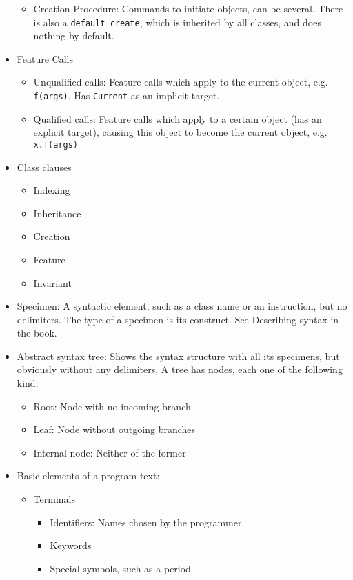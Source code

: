 \documentclass[a4paper]{article}
\newcommand{\inline}[1]{\lstinline!#1!}%
\begin{document}
\begin{itemize}
\begin{itemize}
\item Creation Procedure: Commands to initiate objects, can be several. There is also a \inline{default_create}, which is inherited by all classes, and does nothing by default. 
\end{itemize}
\item Feature Calls
\begin{itemize}
\item Unqualified calls: Feature calls which apply to the current object, e.g. \inline{f(args)}. Has \inline{Current} as an implicit target.
\item Qualified calls: Feature calls which apply to a certain object (has an explicit target), causing this object to become the current object, e.g. \inline{x.f(args)}
\end{itemize}
\item Class clauses
\begin{itemize}
\item Indexing
\item Inheritance
\item Creation
\item Feature
\item Invariant
\end{itemize}
\item Specimen: A syntactic element, such as a class name or an instruction, but no delimiters. The type of a specimen is its construct. See Describing syntax in the book.
\item Abstract syntax tree: Shows the syntax structure with all its specimens, but obviously without any delimiters, A tree has nodes, each one of the following kind:
\begin{itemize}
\item Root: Node with no incoming branch.
\item Leaf: Node without outgoing branches
\item Internal node: Neither of the former
\end{itemize}
\item Basic elements of a program text:
\begin{itemize}
\item Terminals
\begin{itemize}
\item Identifiers: Names chosen by the programmer
\item Keywords
\item Special symbols, such as a period
\end{itemize}
\end{itemize}

\end{itemize}
\end{document}
